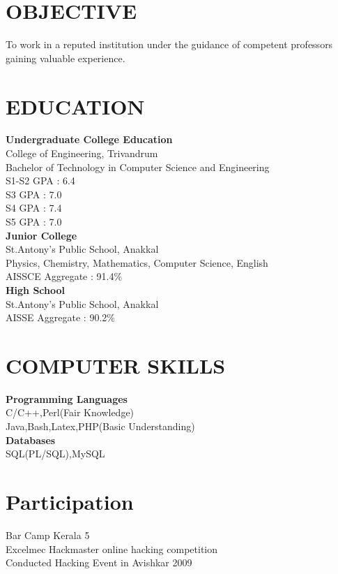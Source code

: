 \documentclass[line,margin]{res}
\begin{document}


\address{joji\_antony@gmx.com}
\address{+91 98092 28749}

\begin{resume}
\section{OBJECTIVE}
To work in a reputed institution under the guidance of competent professors gaining valuable experience.
\section{EDUCATION}

{\bf Undergraduate College Education}\\
College of Engineering, Trivandrum\\
Bachelor of Technology in Computer Science and Engineering\\
S1-S2 GPA : 6.4\\
S3 GPA    : 7.0\\
S4 GPA    : 7.4\\
S5 GPA    : 7.0\\

{\bf Junior College} \\
St.Antony's Public School, Anakkal\\
Physics, Chemistry, Mathematics, Computer Science, English\\
AISSCE Aggregate : 91.4\%\\

{\bf High School} \\
St.Antony's Public School, Anakkal\\
AISSE Aggregate : 90.2\%\\

\section{COMPUTER SKILLS}
{\bf Programming Languages}\\
C/C++,Perl(Fair Knowledge)\\
Java,Bash,Latex,PHP(Basic Understanding)\\
{\bf Databases}\\
SQL(PL/SQL),MySQL\\

\section{Participation}
Bar Camp Kerala 5\\
Excelmec Hackmaster online hacking competition\\
Conducted Hacking Event in Avishkar 2009\\



\end{resume}
\end{document}
